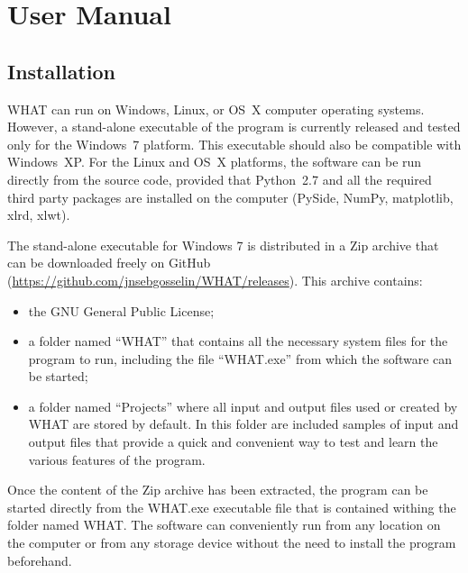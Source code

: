 \documentclass[12pt, letterpaper, fleqn]{report}
\begin{document}
\listoffigures

\tableofcontents

\chapter{User Manual}

\section{Installation}\label{sec:intallation}

WHAT can run on Windows, Linux, or OS X computer operating systems. However, a stand-alone executable of the program is currently released and tested only for the Windows 7 platform. This executable should also be compatible with Windows XP. For the Linux and OS X platforms, the software can be run directly from the source code, provided that Python 2.7 and all the required third party packages are installed on the computer (PySide, NumPy, matplotlib, xlrd, xlwt).

The stand-alone executable for Windows 7 is distributed in a Zip archive that can be downloaded freely on GitHub (\url{https://github.com/jnsebgosselin/WHAT/releases}). This archive contains:

\begin{itemize}

\item{the GNU General Public License;}

\item{a folder named ``WHAT'' that contains all the necessary system files for the program to run, including the file ``WHAT.exe'' from which the software can be started;}

\item{a folder named ``Projects'' where all input and output files used or created by WHAT are stored by default. In this folder are included samples of input and output files that provide a quick and convenient way to test and learn the various features of the program.}

\end{itemize}

Once the content of the Zip archive has been extracted, the program can be started directly from the WHAT.exe executable file that is contained withing the folder named WHAT. The software can conveniently run from any location on the computer or from any storage device without the need to install the program beforehand.
\end{document}
